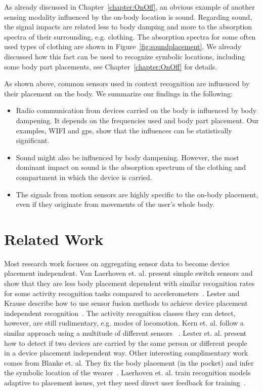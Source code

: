 As already discussed in Chapter~\ref{chapter:OnOff}, an obvious
example of another sensing modality influenced by the on-body location is
sound. Regarding sound, the signal impacts are related less
to body damping and more to the absorption spectra of their surrounding, e.g. clothing.
The absorption spectra for some often used types of clothing
are shown in Figure~\ref{fig:soundplacement}. We already discussed how this fact can be used
to recognize symbolic locations, including some body part placements, 
see Chapter~\ref{chapter:OnOff} for details.


As shown above, common sensors used in context
recognition are influenced by their placement on the body. We
summarize our findings in the following:
\begin{itemize}
	\item Radio communication from devices carried on the body is
          influenced by body dampening.  It depends on the frequencies
          used and body part placement. Our examples, WIFI and
          gps, show that the influences can be statistically
          significant.
        \item Sound might also be influenced by body
          dampening. However, the most dominant impact on sound is the
          absorption spectrum of the clothing and compartment in which
          the device is carried.
        \item The signals from motion sensors are highly specific to
          the on-body placement, even if they originate from movements
          of the user's whole body.
\end{itemize}


\section{Related Work}

Most research work focuses on aggregating sensor data to become device
placement independent. Van Laerhoven et. al. present simple switch
sensors and show that they are less body placement dependent with
similar recognition rates for some activity recognition
tasks compared to accelerometers~\cite{vanLaerhoven:2004p1442}.  
Lester and Krause describe how to use sensor fusion methods 
to achieve device placement independent
recognition~\cite{Lester:2006p856,Krause:2003p1536}. The activity
recognition classes they can detect, however, are still rudimentary,
e.g. modes of locomotion. Kern et. al.  follow a similar approach
using a multitude of different sensors ~\cite{kern2003multi}.  Lester
et. al. present how to detect if two devices are carried by the same
person or different people~\cite{Lester:2004p738} in a device
placement independent way.  Other interesting complimentary work comes
from Blanke et. al. They fix the body placement (in the pocket) and
infer the symbolic location of the
wearer~\cite{Blanke:2008p6128}. Laerhoven et. al. train recognition
models adaptive to placement issues, yet they need direct user
feedback for training~\cite{laerhoven2000what}.

